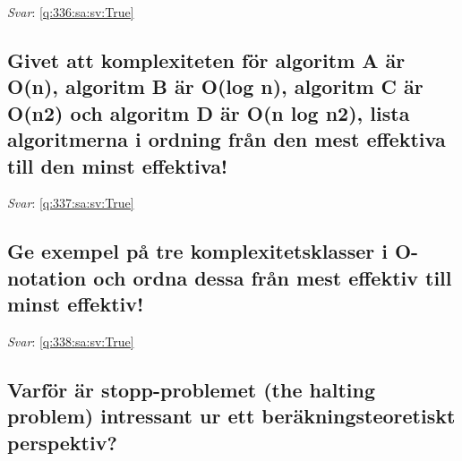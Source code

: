 \documentclass[a4paper,11pt,oneside]{article}
\begin{document}
\begin{sloppypar}
\label{q:336:sa:sv:False}

\vspace{2cm}

\noindent\makebox[\textwidth]{\hrulefill}

\vspace{1cm}

\textit{Svar}: \autoref{q:336:sa:sv:True}



\subsection{Givet att komplexiteten f\"or algoritm A \"ar O(n), algoritm B \"ar O(log n), algoritm C \"ar O(n2) och algoritm D \"ar O(n log n2), lista algoritmerna i ordning fr\r{a}n den mest effektiva till den minst effektiva!}

\label{q:337:sa:sv:False}

\vspace{2cm}

\noindent\makebox[\textwidth]{\hrulefill}

\vspace{1cm}

\textit{Svar}: \autoref{q:337:sa:sv:True}



\subsection{Ge exempel p\r{a} tre komplexitetsklasser i O-notation och ordna dessa fr\r{a}n mest effektiv till minst effektiv!}

\label{q:338:sa:sv:False}

\vspace{2cm}

\noindent\makebox[\textwidth]{\hrulefill}

\vspace{1cm}

\textit{Svar}: \autoref{q:338:sa:sv:True}



\subsection{Varf\"or \"ar stopp-problemet (the halting problem) intressant ur ett ber\"akningsteoretiskt perspektiv?}

\label{q:339:sa:sv:False}

\vspace{2cm}


\end{sloppypar}
\end{document}
